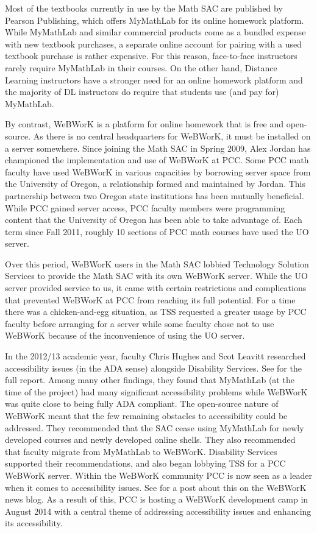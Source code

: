 Most of the textbooks currently in use by the Math SAC are published by Pearson Publishing, which offers MyMathLab for its online homework platform.
While MyMathLab and similar commercial products come as a bundled expense with new textbook purchases, a separate online account for pairing with a used textbook purchase is rather expensive.
For this reason, face-to-face instructors rarely require MyMathLab in their courses.
On the other hand, Distance Learning instructors have a stronger need for an online homework platform and the majority of DL instructors do require that students use (and pay for) MyMathLab.

By contrast, WeBWorK is a platform for online homework that is free and open-source.
As there is no central headquarters for WeBWorK, it must be installed on a server somewhere.
Since joining the Math SAC in Spring 2009, Alex Jordan has championed the implementation and use of WeBWorK at PCC.
Some PCC math faculty have used WeBWorK in various capacities by borrowing server space from the University of Oregon, a relationship formed and maintained by Jordan.
This partnership between two Oregon state institutions has been mutually beneficial.
While PCC gained server access, PCC faculty members were programming content that the University of Oregon has been able to take advantage of.
Each term since Fall 2011, roughly 10 sections of PCC math courses have used the UO server.

Over this period, WeBWorK users in the Math SAC lobbied Technology Solution Services to provide the Math SAC with its own WeBWorK server.
While the UO server provided service to us, it came with certain restrictions and complications that prevented WeBWorK at PCC from reaching its full potential.
For a time there was a chicken-and-egg situation, as TSS requested a greater usage by PCC faculty before arranging for a server while some faculty chose not to use WeBWorK because of the inconvenience of using the UO server.

In the 2012/13 academic year, faculty Chris Hughes and Scot Leavitt researched accessibility issues (in the ADA sense) alongside Disability Services.
See \cite{accessibilityproject} for the full report.
Among many other findings, they found that MyMathLab (at the time of the project) had many significant accessibility problems while WeBWorK was quite close to being fully ADA compliant.
The open-source nature of WeBWorK meant that the few remaining obstacles to accessibility could be addressed.
They recommended that the SAC cease using MyMathLab for newly developed courses and newly developed online shells.
They also recommended that faculty migrate from MyMathLab to WeBWorK.
Disability Services supported their recommendations, and also began lobbying TSS for a PCC WeBWorK server.
Within the WeBWorK community PCC is now seen as a leader when it comes to accessibility issues.
See \cite{webworkblog} for a post about this on the WeBWorK news blog.
As a result of this, PCC is hosting a WeBWorK development camp in August 2014 with a central theme of addressing accessibility issues and enhancing its accessibility.
\label{other:page:disabilityservices}

